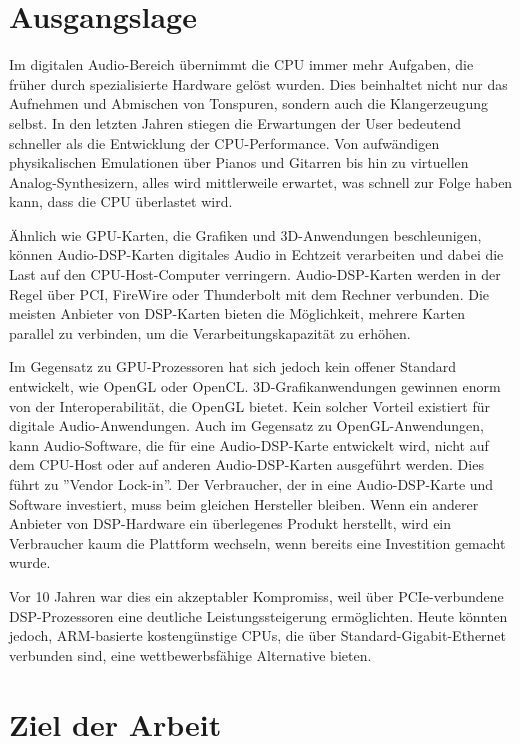 \section{Ausgangslage}

Im digitalen Audio-Bereich übernimmt die CPU immer mehr Aufgaben, die früher durch spezialisierte Hardware gelöst wurden. Dies beinhaltet nicht nur das Aufnehmen und Abmischen von Tonspuren, sondern auch die Klangerzeugung selbst. In den letzten Jahren stiegen die Erwartungen der User bedeutend schneller als die Entwicklung der CPU-Performance. Von aufwändigen physikalischen Emulationen über Pianos und Gitarren bis hin zu virtuellen Analog-Synthesizern, alles wird mittlerweile erwartet, was schnell zur Folge haben kann, dass die CPU überlastet wird.

Ähnlich wie GPU-Karten, die Grafiken und 3D-Anwendungen beschleunigen, können Audio-DSP-Karten digitales Audio in Echtzeit verarbeiten und dabei die Last auf den CPU-Host-Computer verringern. Audio-DSP-Karten werden in der Regel über PCI, FireWire oder Thunderbolt mit dem Rechner verbunden. Die meisten Anbieter von DSP-Karten bieten die Möglichkeit, mehrere Karten parallel zu verbinden, um die Verarbeitungskapazität zu erhöhen.

Im Gegensatz zu GPU-Prozessoren hat sich jedoch kein offener Standard entwickelt, wie OpenGL oder OpenCL. 3D-Grafikanwendungen gewinnen enorm von der Interoperabilität, die OpenGL bietet. Kein solcher Vorteil existiert für digitale Audio-Anwendungen. Auch im Gegensatz zu OpenGL-Anwendungen, kann Audio-Software, die für eine Audio-DSP-Karte entwickelt wird, nicht auf dem CPU-Host oder auf anderen Audio-DSP-Karten ausgeführt werden. Dies führt zu ”Vendor Lock-in”. Der Verbraucher, der in eine Audio-DSP-Karte und Software investiert, muss beim gleichen Hersteller bleiben. Wenn ein anderer Anbieter von DSP-Hardware ein überlegenes Produkt herstellt, wird ein Verbraucher kaum die Plattform wechseln, wenn bereits eine Investition  gemacht wurde.

Vor 10 Jahren war dies ein akzeptabler Kompromiss, weil über PCIe-verbundene DSP-Prozessoren eine deutliche Leistungssteigerung ermöglichten. Heute könnten jedoch, ARM-basierte kostengünstige CPUs, die über Standard-Gigabit-Ethernet verbunden sind, eine wettbewerbsfähige Alternative bieten.


\section{Ziel der Arbeit}

